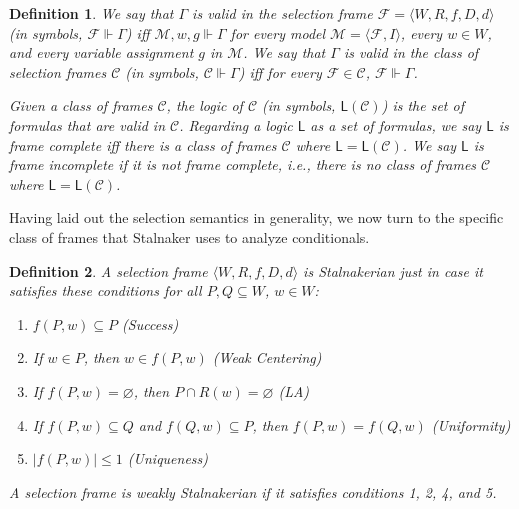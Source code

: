 \documentclass[12pt]{article}
\newtheorem{definition}{Definition}
\newcommand{\tup}[1]{\langle #1 \rangle}
\begin{document}
\begin{definition}
\label{Definition:SelectionValidity}
    We say that $\Gamma$ is \emph{valid in the selection frame} $\mathcal{F} = \tup{W,R,f,D,d}$ (in symbols, $\mathcal{F} \Vdash \Gamma$) iff $\mathcal{M},w,g \Vdash \Gamma$ for every model $\mathcal{M} = \tup{\mathcal{F},I}$, every $w \in W$, and every variable assignment $g$ in $\mathcal{M}$. 
    We say that $\Gamma$ is \emph{valid in the class of selection frames} $\mathcal{C}$ (in symbols, $\mathcal{C} \Vdash \Gamma$) iff for every $\mathcal{F}\in\mathcal{C}$, $\mathcal{F} \Vdash \Gamma$. 

    Given a class of frames $\mathcal{C}$, the \emph{logic of $\mathcal{C}$} (in symbols, $\mathsf{L}(\mathcal{C})$) is the set of formulas that are valid in $\mathcal{C}$. 
    Regarding a logic $\mathsf{L}$ as a set of formulas, we say $\mathsf{L}$ is \emph{frame complete} iff there is a class of frames $\mathcal{C}$ where $\mathsf{L} = \mathsf{L}(\mathcal{C})$. 
    We say $\mathsf{L}$ is \emph{frame incomplete} if it is not frame complete, i.e., there is no class of frames $\mathcal{C}$ where $\mathsf{L} = \mathsf{L}(\mathcal{C})$. 
\end{definition}

Having laid out the selection semantics in generality, we now turn to the specific class of frames that Stalnaker uses to analyze conditionals. 

\begin{definition}
\label{Definition:Stalnakerian Function}
    A selection frame $\tup{ W,R,f,D,d}$ is \emph{Stalnakerian} just in case it satisfies these conditions for all $P,Q\subseteq W$, $w\in W$:
    \begin{enumerate}
        \item $f(P,w) \subseteq P$ \hfill (Success)
        \item If $w \in P$, then $w \in f(P,w)$ \hfill (Weak Centering)
        \item If $f(P,w) = \varnothing$, then $P \cap R(w) = \varnothing$ \hfill (LA)
        \item If $f(P,w) \subseteq Q$ and $f(Q,w) \subseteq P$, then $f(P,w) = f(Q,w)$ \hfill (Uniformity)
        \item $|f(P,w)| \leq 1$ \hfill (Uniqueness)
    \end{enumerate}
    A selection frame is \emph{weakly Stalnakerian} if it satisfies conditions 1, 2, 4, and 5. 
\end{definition}
\end{document}
